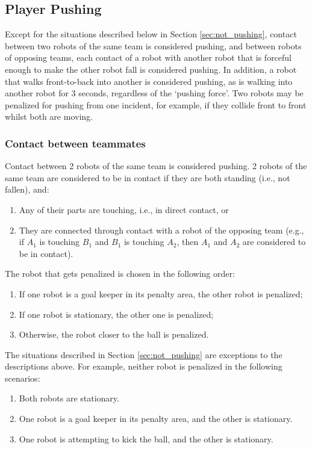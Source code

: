 \documentclass[12pt]{article}
\begin{document}

\subsection{Player Pushing}
\label{sec:player_pushing}

Except for the situations described below in Section \ref{sec:not_pushing}, contact between two robots of the same team is considered pushing, and between robots of opposing teams, each contact of a robot with another robot that is forceful enough to make the other robot fall is considered pushing. In addition, a robot that walks front-to-back into another is considered pushing, as is walking into another robot for 3 seconds, regardless of the `pushing force'. Two robots may be penalized for pushing from one incident, for example, if they collide front to front whilst both are moving.

\subsubsection{Contact between teammates}

Contact between 2 robots of the same team is considered pushing. 2 robots of the same team are considered to be in contact if they are both standing (i.e., not fallen), and:
\begin{enumerate}
\item Any of their parts are touching, i.e., in direct contact, or
\item They are connected through contact with a robot of the opposing team (e.g., if $A_1$ is touching $B_1$ and $B_1$ is touching $A_2$, then $A_1$ and $A_2$ are considered to be in contact).
\end{enumerate}

The robot that gets penalized is chosen in the following order:
\begin{enumerate}
\item If one robot is a goal keeper in its penalty area, the other robot is penalized;
\item If one robot is stationary, the other one is penalized;
\item Otherwise, the robot closer to the ball is penalized.
\end{enumerate}

The situations described in Section \ref{sec:not_pushing} are exceptions to the descriptions above. For example, neither robot is penalized in the following scenarios:
\begin{enumerate}
\item Both robots are stationary.
\item One robot is a goal keeper in its penalty area, and the other is stationary.
\item One robot is attempting to kick the ball, and the other is stationary.
\end{enumerate}
\end{document}

